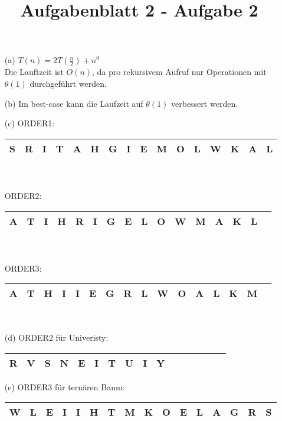\documentclass{article}
\title{Aufgabenblatt 2 - Aufgabe 2}
\author{}
\begin{document}
\maketitle

\begin{enumerate}
\item[(a)]
$T(n) = 2T\left(\frac{n}{2}\right)+n^0$\\
Die Lauftzeit ist $O(n)$, da pro rekursivem Aufruf nur Operationen mit $\theta\left(1\right)$ durchgeführt werden.
\item[(b)]
Im best-case kann die Laufzeit auf $\theta\left(1\right)$ verbessert werden.
\item[(c)]
ORDER1:
\begin{tabular}{|c|c|c|c|c|c|c|c|c|c|c|c|c|c|c|c|}
	\hline S & R & I & T & A & H & G & I & E & M & O & L & W & K & A & L \\
	\hline
\end{tabular}\\
\\
ORDER2:
\begin{tabular}{|c|c|c|c|c|c|c|c|c|c|c|c|c|c|c|c|}
	\hline A & T & I & H & R & I & G & E & L & O & W & M & A & K & L \\
	\hline
\end{tabular}\\
\\
ORDER3:
\begin{tabular}{|c|c|c|c|c|c|c|c|c|c|c|c|c|c|c|c|}
	\hline A & T & H & I & I & E & G & R & L & W & O & A & L & K & M \\
	\hline
\end{tabular}\\
\item[(d)]
ORDER2 für Univeristy:
\begin{tabular}{|c|c|c|c|c|c|c|c|c|c|c|c|c|c|c|c|}
	\hline R & V & S & N & E & I & T & U & I & Y \\
	\hline
\end{tabular}
\item[(e)]
ORDER3 für ternären Baum: \\
\begin{tabular}{|c|c|c|c|c|c|c|c|c|c|c|c|c|c|c|c|}
	\hline W & L & E & I & I & H & T & M & K & O & E & L & A & G & R & S \\
	\hline
\end{tabular}\\
\end{enumerate}
\end{document}
